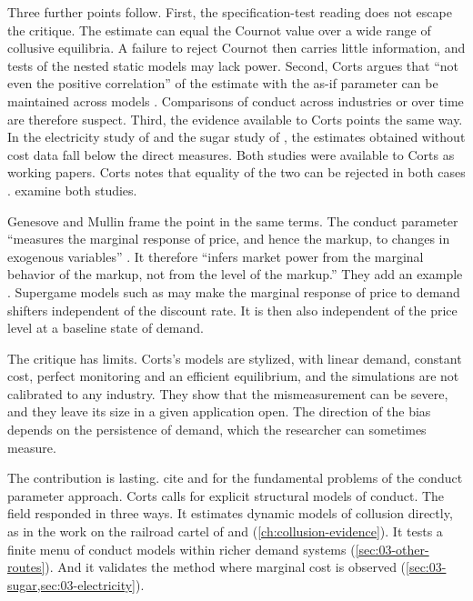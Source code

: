 Three further points follow. First, the specification-test reading does not escape the critique. The estimate can equal
the Cournot value over a wide range of collusive equilibria. A failure to reject Cournot then carries little information,
and tests of the nested static models may lack power. Second, Corts argues that ``not even the positive correlation'' of
the estimate with the as-if parameter can be maintained across models \citep[p.~245]{Corts1999}. Comparisons of conduct
across industries or over time are therefore suspect. Third, the evidence available to Corts points the same way. In the
electricity study of \citet{Wolfram1999} and the sugar study of \citet{GenesoveMullin1998}, the estimates obtained without
cost data fall below the direct measures. Both studies were available to Corts as working papers. Corts notes that equality of the
two can be rejected in both cases \citep[p.~245]{Corts1999}.  examine both studies.

Genesove and Mullin frame the point in the same terms. The conduct parameter ``measures the marginal response of price, and
hence the markup, to changes in exogenous variables'' \citep[p.~2]{GenesoveMullin1995}. It therefore ``infers market power
from the marginal behavior of the markup, not from the level of the markup.'' They add an example
\citep[p.~3]{GenesoveMullin1995}. Supergame models such as \citet{RotembergSaloner1986} may make the marginal response of
price to demand shifters independent of the discount rate. It is then also independent of the price level at a baseline
state of demand.

The critique has limits. Corts's models are stylized, with linear demand, constant cost, perfect monitoring and an efficient
equilibrium, and the simulations are not calibrated to any industry. They show that the mismeasurement can be severe, and
they leave its size in a given application open. The direction of the bias depends on the persistence of demand, which the
researcher can sometimes measure.

The contribution is lasting. \citet[fn.~7]{BerryHaile2014} cite \citet{Corts1999} and \citet{ReissWolak2007} for the
fundamental problems of the conduct parameter approach. Corts calls for explicit structural models of conduct. The field
responded in three ways. It estimates dynamic models of collusion directly, as in the work on the railroad cartel of
\citet{Porter1983} and \citet{Ellison1994} (\cref{ch:collusion-evidence}). It tests a finite menu of conduct models within
richer demand systems (\cref{sec:03-other-routes}). And it validates the method where marginal cost is observed
(\cref{sec:03-sugar,sec:03-electricity}).


